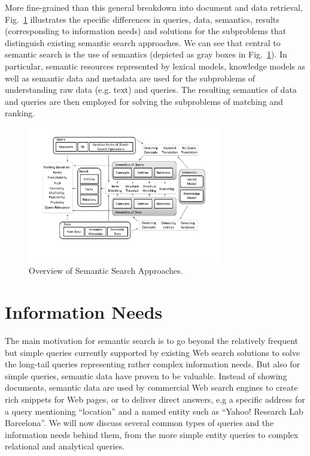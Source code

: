More fine-grained than this general breakdown into document and data retrieval, Fig.~\ref{fig:semsearch_detailed} illustrates the specific differences in queries, data, semantics, results (corresponding to information needs) and solutions for the subproblems that distinguish existing semantic search approaches. We can see that central to semantic search is the use of semantics (depicted as gray boxes in Fig.~\ref{fig:semsearch_detailed}). In particular, semantic resources represented by lexical models, knowledge models as well as semantic data and metadata are used for the subproblems of understanding raw data (e.g. text) and queries. The resulting semantics of data and queries are then employed for solving the subproblems of matching and ranking.   
  

\begin{figure}[tbh]
	\centering
		\includegraphics[width=0.75\textwidth]{figs/semsearch_detailed}
	\caption{Overview of Semantic Search Approaches.}
	\label{fig:semsearch_detailed}
\end{figure}

\section{Information Needs}\label{sec:needs}

The main motivation for semantic search is to go beyond the relatively frequent but simple queries currently supported by existing Web search solutions to solve the long-tail queries representing rather complex information needs. But also for simple queries, semantic data have proven to be valuable. Instead of showing documents, semantic data are used by commercial Web search engines to create rich snippets for Web pages, or to deliver direct answers, e.g a specific address for a query mentioning ``location'' and a named entity such as ``Yahoo! Research Lab Barcelona''. We will now discuss several common types of queries and the information needs behind them, from the more simple entity queries to complex relational and analytical queries. 

